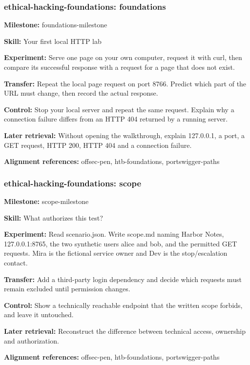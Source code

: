 \subsubsection{ethical-hacking-foundations: foundations}
\noindent\textbf{Milestone:} foundations-milestone\par
\noindent\textbf{Skill:} Your first local HTTP lab\par
\noindent\textbf{Experiment:} Serve one page on your own computer, request it with curl, then compare its successful response with a request for a page that does not exist.\par
\noindent\textbf{Transfer:} Repeat the local page request on port 8766. Predict which part of the URL must change, then record the actual response.\par
\noindent\textbf{Control:} Stop your local server and repeat the same request. Explain why a connection failure differs from an HTTP 404 returned by a running server.\par
\noindent\textbf{Later retrieval:} Without opening the walkthrough, explain 127.0.0.1, a port, a GET request, HTTP 200, HTTP 404 and a connection failure.\par
\noindent\textbf{Alignment references:} offsec-pen, htb-foundations, portswigger-paths\par
\subsubsection{ethical-hacking-foundations: scope}
\noindent\textbf{Milestone:} scope-milestone\par
\noindent\textbf{Skill:} What authorizes this test?\par
\noindent\textbf{Experiment:} Read scenario.json. Write scope.md naming Harbor Notes, 127.0.0.1:8765, the two synthetic users alice and bob, and the permitted GET requests. Mira is the fictional service owner and Dev is the stop/escalation contact.\par
\noindent\textbf{Transfer:} Add a third-party login dependency and decide which requests must remain excluded until permission changes.\par
\noindent\textbf{Control:} Show a technically reachable endpoint that the written scope forbids, and leave it untouched.\par
\noindent\textbf{Later retrieval:} Reconstruct the difference between technical access, ownership and authorization.\par
\noindent\textbf{Alignment references:} offsec-pen, htb-foundations, portswigger-paths\par
